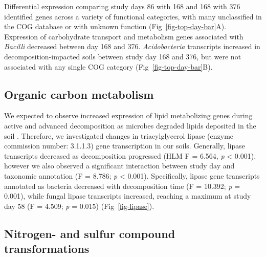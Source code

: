 \documentclass[
  sn-nature,
  lineno, referee]{sn-jnl}
\begin{document}
Differential expression comparing study days 86 with 168 and 168 with
376 identified genes across a variety of functional categories, with
many unclassified in the COG database or with unknown function
(Fig~\ref{fig-top-day-bar}A). Expression of carbohydrate transport and
metabolism genes associated with \emph{Bacilli} decreased between day
168 and 376. \emph{Acidobacteria} transcripts increased in
decomposition-impacted soils between study day 168 and 376, but were not
associated with any single COG category (Fig~\ref{fig-top-day-bar}B).

\subsection{Organic carbon metabolism}\label{organic-carbon-metabolism}

We expected to observe increased expression of lipid metabolizing genes
during active and advanced decomposition as microbes degraded lipids
deposited in the soil \citep{howard_characterization_2010}. Therefore,
we investigated changes in triacylglycerol lipase (enzyme commission
number: 3.1.1.3) gene transcription in our soils. Generally, lipase
transcripts decreased as decomposition progressed (HLM F = 6.564,
\emph{p} \textless{} 0.001), however we also observed a significant
interaction between study day and taxonomic annotation (F = 8.786;
\emph{p} \textless{} 0.001). Specifically, lipase gene transcripts
annotated as bacteria decreased with decomposition time (F = 10.392;
\emph{p} = 0.001), while fungal lipase transcripts increased, reaching a
maximum at study day 58 (F = 4.509; \emph{p} = 0.015)
(Fig~\ref{fig-lipase}).

\subsection{Nitrogen- and sulfur compound
transformations}\label{nitrogen--and-sulfur-compound-transformations}
\end{document}
